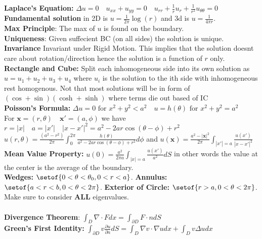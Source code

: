 \documentclass[answers,12pt,addpoints]{exam}
\begin{document}
\textbf{Laplace's Equation:} $\Delta u = 0 \quad u_{xx} + u_{yy} = 0 \quad u_{rr} + \frac{1}{r}u_r + \frac{1}{r^2}u_{\theta\theta} = 0$\\
\textbf{Fundamental solution} in 2D is $u = \frac{1}{2\pi} \log(r)$ and 3d is $u = \frac{1}{4\pi r}$.\\
\textbf{Max Principle}: The max of $u$ is found on the boundary.\\
\textbf{Uniqueness}: Given suffecient BC (on all sides) the solution is unique.\\
\textbf{Invariance} Invariant under Rigid Motion. This implies that the solution doesnt care about rotation/direction hence the solution is a function of $r$ only. \\
\textbf{Rectangle and Cube:} Split each inhomogeneous side into its own solution as $u = u_1 + u_2 + u_3 + u_4$ where $u_i$ is the solution to the ith side with inhomogeneous rest homogenous. Not that most solutions will be in form of $(\cos + \sin)(\cosh + \sinh)$ where terms die out based of IC\\
\textbf{Poisson's Formula:} $\Delta u = 0 \text{ for } x^2 + y^2 < a^2 \quad u=h(\theta) \text{ for } x^2 + y^2 = a^2$ \\
For $\boldsymbol{x} = (r, \theta) \quad \boldsymbol{x}' = (a, \phi)$ we have $r = |x| \quad a = |x'| \quad |x- x'|^2 = a^2 - 2ar\cos(\theta - \phi) + r^2$\\
$u(r, \theta) = \frac{(a^2-r^2)}{2\pi} \int_0^{2\pi} \frac{h(\theta)}{a^2 - 2ar\cos(\theta - \phi) + r^2}d\phi$ and $u(\boldsymbol{x}) = \frac{a^2 - |\boldsymbol{x}|^2}{2\pi} \int_{|x'| = a} \frac{u(x')}{|x-x'|^2}$\\
\textbf{Mean Value Property:} $u(0) = \frac{a^2}{2\pi a } \int_{|x| = a} \frac{u(x')}{a^2}dS $ in other words the value at the center is the average of the boundary.\\
\textbf{Wedges:} $\setof{0 < \theta < \theta_0, 0 < r < a}$. 
\textbf{Annulus:} $\setof{a < r < b, 0 < \theta < 2\pi}$.
\textbf{Exterior of Circle:} $\setof{r > a, 0 < \theta < 2\pi}$.\\
Make sure to consider \textbf{ALL} eigenvalues. \\\\
\textbf{Divergence Theorem}: $\int_{D} \nabla \cdot F dx = \int_{\partial D} F \cdot n dS$\\
\textbf{Green's First Identity:} $\int_{\partial D} v \frac{\partial u}{\partial n} dS = \int_{D} \nabla v \cdot \nabla u dx + \int_{D} v \Delta u dx$\\
\end{document}
